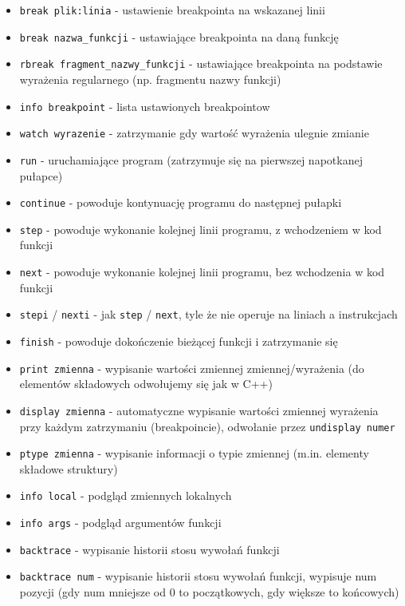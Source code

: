 \begin{itemize}
	\item\Verb$break plik:linia$ - ustawienie breakpointa na wskazanej linii
	\item\Verb$break nazwa_funkcji$ - ustawiające breakpointa na daną funkcję
	\item\Verb$rbreak fragment_nazwy_funkcji$ - ustawiające breakpointa na podstawie wyrażenia regularnego (np. fragmentu nazwy funkcji)
	\item\Verb$info breakpoint$ - lista ustawionych breakpointow
	\item\Verb$watch wyrazenie$ - zatrzymanie gdy wartość wyrażenia ulegnie zmianie
\vspace{6pt}
	\item\Verb$run$ - uruchamiające program (zatrzymuje się na pierwszej napotkanej pułapce)
	\item\Verb$continue$ - powoduje kontynuację programu do następnej pułapki
	\item\Verb$step$ - powoduje wykonanie kolejnej linii programu, z wchodzeniem w kod funkcji
	\item\Verb$next$ - powoduje wykonanie kolejnej linii programu, bez wchodzenia w kod funkcji
	\item\Verb$stepi$ / \Verb$nexti$ - jak \Verb$step$ / \Verb$next$, tyle że nie operuje na liniach a instrukcjach
	\item\Verb$finish$ - powoduje dokończenie bieżącej funkcji i zatrzymanie się
\vspace{6pt}
	\item\Verb$print zmienna$ - wypisanie wartości zmiennej zmiennej/wyrażenia (do elementów składowych odwołujemy się jak w C++)
	\item\Verb$display zmienna$ - automatyczne wypisanie wartości zmiennej wyrażenia przy każdym zatrzymaniu (breakpoincie), odwołanie przez \Verb$undisplay numer$
	\item\Verb$ptype zmienna$ - wypisanie informacji o typie zmiennej (m.in. elementy składowe struktury)
	\item\Verb$info local$ - podgląd zmiennych lokalnych
	\item\Verb$info args$ - podgląd argumentów funkcji
	\item\Verb$backtrace$ - wypisanie historii stosu wywołań funkcji
	\item\Verb$backtrace num$ - wypisanie historii stosu wywołań funkcji, wypisuje num pozycji (gdy num mniejsze od 0 to początkowych, gdy większe to końcowych)
\vspace{6pt}

\end{itemize}
